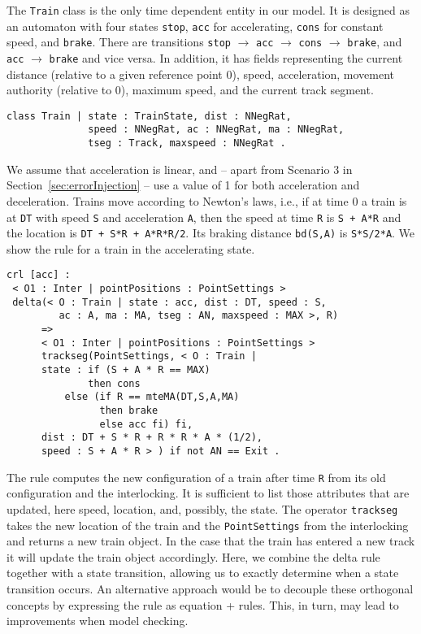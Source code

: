 The \verb|Train| class is the only time dependent entity in our
model. It is designed as an automaton with four
states \verb|stop|, \verb|acc| for accelerating, \verb|cons| for
constant speed, and \verb|brake|. There are transitions \verb|stop|
$\to $ \verb|acc| $\to $ \verb|cons| $\to $ \verb|brake|,
and \verb|acc| $\to$ \verb|brake| and vice versa. In addition, it has
fields representing the current distance (relative to a given
reference point 0), speed, acceleration, movement authority (relative
to 0), maximum speed, and the current track segment.
\begin{lstlisting}
class Train | state : TrainState, dist : NNegRat,
              speed : NNegRat, ac : NNegRat, ma : NNegRat,
              tseg : Track, maxspeed : NNegRat .
\end{lstlisting}
We assume that acceleration is linear, and -- apart from Scenario 3 in Section~\ref{sec:errorInjection} -- use a value of 1 for both acceleration and deceleration. Trains move according to Newton's laws, i.e., if at time $0$ a train is at \verb|DT| with speed \verb|S| and acceleration \verb|A|, then the speed at time \verb|R| is \verb|S + A*R| and the location is \verb|DT + S*R + A*R*R/2|. Its braking distance \verb|bd(S,A)| is \verb|S*S/2*A|. We show the rule for a train in the accelerating state.

\begin{lstlisting}
crl [acc] :
 < O1 : Inter | pointPositions : PointSettings >
 delta(< O : Train | state : acc, dist : DT, speed : S,
         ac : A, ma : MA, tseg : AN, maxspeed : MAX >, R)
      =>
      < O1 : Inter | pointPositions : PointSettings >
      trackseg(PointSettings, < O : Train |  
      state : if (S + A * R == MAX)     
              then cons
	      else (if R == mteMA(DT,S,A,MA)
	            then brake
	            else acc fi) fi, 
      dist : DT + S * R + R * R * A * (1/2),
      speed : S + A * R > ) if not AN == Exit .
\end{lstlisting}
The rule computes the new configuration of a train after
time \texttt{R} from its old configuration and the interlocking.
It is sufficient
to list those attributes that are updated, here speed,
location, and, possibly, the state.  The operator \verb|trackseg|
takes the new location of the train and the \verb|PointSettings| from
the interlocking and returns a new train object.  In the case that the
train has entered a new track it will update the train object
accordingly. Here, we combine the delta rule together with a state
transition, allowing us to exactly determine when a state transition
occurs. An alternative approach would be to decouple these 
orthogonal concepts by expressing the rule as equation + rules.
This, in turn, may lead to improvements when model checking.

